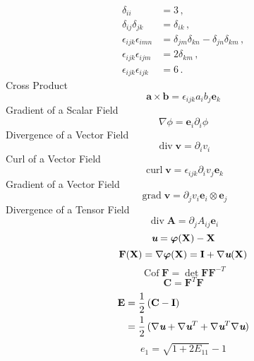 \documentclass[letterpaper,10pt]{article}
\DeclareMathOperator*{\tgrad}{grad}
\DeclareMathOperator*{\tdiv}{div}
\DeclareMathOperator*{\tcurl}{curl}
\DeclareMathOperator*{\Cof}{Cof}
\def\mathbi#1{\textbf{\em #1}}
\def\half{\frac{1}{2}\,}
\def\bphi{\boldsymbol\varphi}
\def\X{\mathbf{X}}
\def\u{\mathbi{u}}
\def\F{\mathbf{F}}
\def\E{\mathbf{E}}
\def\I{\mathbf{I}}
\begin{document}
\begin{multicols}{3}
\begin{align*}
\delta_{ii}&=3\,,\\
\delta_{ij}\delta_{jk}&=\delta_{ik}\,,\\
\epsilon_{ijk}\epsilon_{imn}&=\delta_{jm}\delta_{kn}-\delta_{jn}\delta_{km}\,,\\
\epsilon_{ijk}\epsilon_{ijm}&=2\delta_{km}\,,\\
\epsilon_{ijk}\epsilon_{ijk}&=6\,.
\end{align*}
Cross Product
\begin{equation*}
\mathbf{a}\times\mathbf{b}=\epsilon_{ijk}a_i b_j\mathbf{e}_k
\end{equation*}
Gradient of a Scalar Field
\begin{equation*}
\nabla\phi=\mathbf{e}_i\partial_i\phi
\end{equation*}
Divergence of a Vector Field
\begin{equation*}
 \tdiv\mathbf{v}=\partial_i v_i
\end{equation*}
Curl of a Vector Field
\begin{equation*}
\tcurl\mathbf{v}=\epsilon_{ijk}\partial_i v_j\mathbf{e}_k
\end{equation*}
Gradient of a Vector Field
\begin{equation*}
\tgrad\mathbf{v}=\partial_j v_i\mathbf{e}_i\otimes\mathbf{e}_j
\end{equation*}
Divergence of a Tensor Field
\begin{equation*}
\tdiv\mathbf{A}=\partial_j A_{ij}\mathbf{e}_i
\end{equation*}
\begin{equation*}
\mathbi{u}=\bphi(\X)-\X
\end{equation*}
\begin{equation*}
\F(\X)=\nabla\bphi(\X)=\I+\nabla\u(\X)
\end{equation*}
\begin{equation*}
\Cof\F=\det\F\F^{-T}
\end{equation*}
\begin{equation*}
\mathbf{C}=\F^T\F
\end{equation*}
\begin{align*}
\E&=\half(\mathbf{C}-\I)\\
&=\half(\nabla\u+\nabla\u^T+\nabla\u^T\nabla\u)
\end{align*}
\begin{equation*}
e_1=\sqrt{1+2E_{11}}-1
\end{equation*}

\end{multicols}
\end{document}
